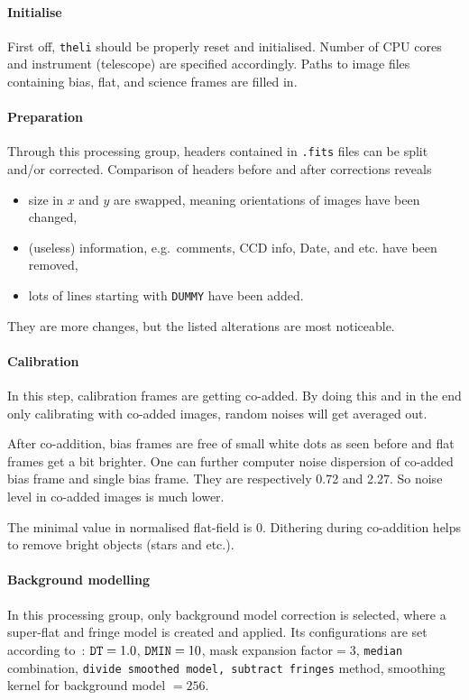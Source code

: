 \paragraph{Initialise}  First off, \verb|theli| should be properly reset and initialised. Number of CPU cores and instrument (telescope) are specified accordingly. Paths to image files containing bias, flat, and science frames are filled in.

\paragraph{Preparation}
Through this processing group, headers contained in \verb|.fits| files can be split and/or corrected. Comparison of headers before and after corrections reveals
\begin{itemize}
   \item size in $x$ and $y$ are swapped, meaning orientations of images have been changed,
   \item (useless) information, e.g.~comments, CCD info, Date, and etc. have been removed,
   \item lots of lines starting with \verb|DUMMY| have been added.
\end{itemize}
They are more changes, but the listed alterations are most noticeable.

\paragraph{Calibration}
In this step, calibration frames are getting co-added. By doing this and in the end only calibrating with co-added images, random noises will get averaged out.  

After co-addition, bias frames are free of small white dots as seen before and flat frames get a bit brighter. One can further computer noise dispersion of co-added bias frame and single bias frame. They are respectively \num{0.72} and \num{2.27}. So noise level in co-added images is much lower.

The minimal value in normalised flat-field is $0$. Dithering during co-addition helps to remove bright objects (stars and etc.).

\paragraph{Background modelling}
In this processing group, only background model correction is selected, where a super-flat and fringe model is created and applied. Its configurations are set according to~\cite{manual}: $\verb|DT| = 1.0$, $\verb|DMIN|=10$, mask expansion factor$=3$, \verb|median| combination, \verb|divide smoothed model, subtract fringes| method, smoothing kernel for background model $=256$.

